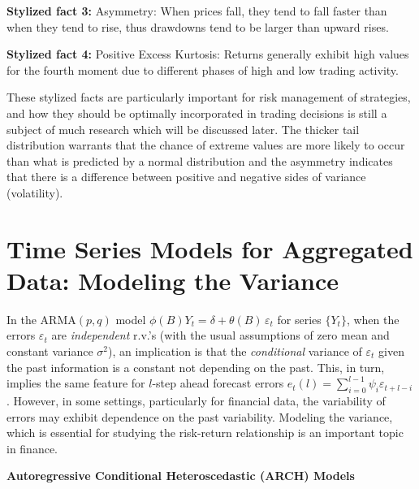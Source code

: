 \noindent\textbf{Stylized fact 3:} Asymmetry: When prices fall, they tend to fall faster
than when they tend to rise, thus drawdowns tend to be larger than upward rises. \twomedskip

\noindent\textbf{Stylized fact 4:} Positive Excess Kurtosis: Returns generally exhibit high values for the fourth moment due to different phases of high and low trading activity. \twomedskip


These stylized facts are particularly important for risk management of strategies, and how they should be optimally incorporated in trading decisions is still a subject of much research which will be discussed later. The thicker tail distribution warrants that the chance of extreme values are more likely to occur than what is predicted by a normal distribution and the asymmetry indicates that there is a difference between positive and negative sides of variance (volatility). \label{in:assetret2} \label{in:style2}



\section{Time Series Models for Aggregated Data: Modeling the Variance}\label{in:modelvar1}

In the ARMA$(p,q)$ model $\phi(B)Y_t= \delta + \theta(B) \,\varepsilon_t$ for series $\{ Y_t \}$, when the errors $\varepsilon_t$ are \emph{independent} r.v.'s (with the usual assumptions of zero mean and constant variance $\sigma^2$), an implication is that the \textit{conditional} variance of $\varepsilon_t$ given the past information is a constant not depending on the past. This, in turn, implies the same feature for $l$-step ahead forecast errors $e_t(l) = \sum_{i=0}^{l-1} \psi_i \varepsilon_{t+l-i}$. However, in some settings, particularly for financial data, the variability of errors may exhibit dependence on the past variability. Modeling the variance, which is essential for studying the risk-return relationship is an important topic in finance. \twomedskip


\noindent \textbf{Autoregressive Conditional Heteroscedastic (ARCH) Models} \label{in:arch} \twomedskip


